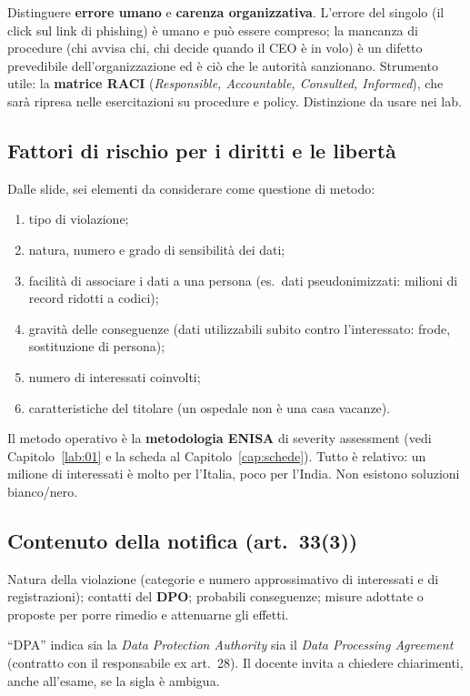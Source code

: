 \begin{esame}
Distinguere \textbf{errore umano} e \textbf{carenza organizzativa}. L'errore del singolo (il click sul
link di phishing) è umano e può essere compreso; la mancanza di procedure (chi avvisa chi, chi
decide quando il CEO è in volo) è un difetto prevedibile dell'organizzazione ed è ciò che le autorità
sanzionano. Strumento utile: la \textbf{matrice RACI} (\emph{Responsible, Accountable, Consulted,
Informed}), che sarà ripresa nelle esercitazioni su procedure e policy. Distinzione da usare nei lab.
\end{esame}

\subsection{Fattori di rischio per i diritti e le libertà}
Dalle slide, sei elementi da considerare come questione di metodo:
\begin{enumerate}[label=\alph*)]
  \item tipo di violazione;
  \item natura, numero e grado di sensibilità dei dati;
  \item facilità di associare i dati a una persona (es.\ dati pseudonimizzati: milioni di record
    ridotti a codici);
  \item gravità delle conseguenze (dati utilizzabili subito contro l'interessato: frode, sostituzione
    di persona);
  \item numero di interessati coinvolti;
  \item caratteristiche del titolare (un ospedale non è una casa vacanze).
\end{enumerate}
Il metodo operativo è la \textbf{metodologia ENISA} di severity assessment (vedi
Capitolo~\ref{lab:01} e la scheda al Capitolo~\ref{cap:schede}). Tutto è relativo: un milione di
interessati è molto per l'Italia, poco per l'India. Non esistono soluzioni bianco/nero.

\subsection{Contenuto della notifica (art.~33(3))}
Natura della violazione (categorie e numero approssimativo di interessati e di registrazioni);
contatti del \textbf{DPO}; probabili conseguenze; misure adottate o proposte per porre rimedio e
attenuarne gli effetti.

\begin{nota}
``DPA'' indica sia la \emph{Data Protection Authority} sia il \emph{Data Processing Agreement}
(contratto con il responsabile ex art.~28). Il docente invita a chiedere chiarimenti, anche all'esame,
se la sigla è ambigua.
\end{nota}

